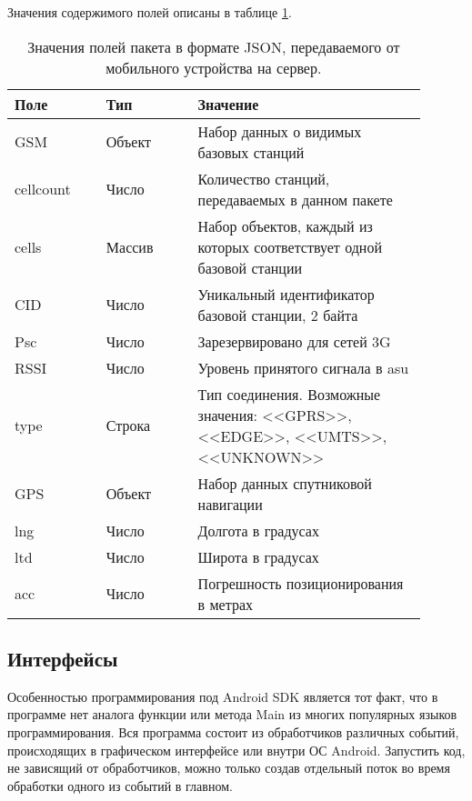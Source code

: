 Значения содержимого полей описаны в таблице \ref{tab:json-raw-format}.
\begin{table}
	\caption{\label{tab:json-raw-format}Значения полей пакета в формате JSON, передаваемого от мобильного устройства на сервер.}
	\begin{center}
		\begin{tabular}{|p{0.2\linewidth}|p{0.2\linewidth}|p{0.5\linewidth}|}
			\hline
			Поле & Тип & Значение \\
			\hline
			GSM & Объект & Набор данных о видимых базовых станций \\
			\hline
			cellcount & Число & Количество станций, передаваемых в данном пакете \\
			\hline
			cells & Массив & Набор объектов, каждый из которых соответствует одной базовой станции \\
			\hline
			CID & Число & Уникальный идентификатор базовой станции, 2 байта \\
			\hline
			Psc & Число & Зарезервировано для сетей 3G \\
			\hline
			RSSI & Число & Уровень принятого сигнала в asu\\
			\hline
			type & Строка & Тип соединения. Возможные значения: <<GPRS>>, <<EDGE>>, <<UMTS>>, <<UNKNOWN>> \\
			\hline
			GPS & Объект & Набор данных спутниковой навигации \\
			\hline
			lng & Число & Долгота в градусах \\
			\hline
			ltd & Число & Широта в градусах \\
			\hline
			acc & Число & Погрешность позиционирования в метрах \\
			\hline
		\end{tabular}
	\end{center}
\end{table}

\subsection{Интерфейсы}

Особенностью программирования под Android SDK является тот факт, что в программе нет аналога функции или метода Main из многих популярных языков программирования. Вся программа состоит из обработчиков различных событий, происходящих в графическом интерфейсе или внутри ОС Android. Запустить код, не зависящий от обработчиков, можно только создав отдельный поток во время обработки одного из событий в главном.


